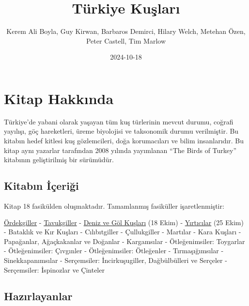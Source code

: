 \documentclass[
  a4paper,
  DIV=11,
  numbers=noendperiod]{scrreprt}
\title{Türkiye Kuşları}
\author{Kerem Ali Boyla, Guy Kirwan, Barbaros Demirci, Hilary Welch,
Metehan Özen, Peter Castell, Tim Marlow}
\date{2024-10-18}
\renewcommand*\contentsname{Table of contents}
\newcommand\contentsname{Table of contents}
\begin{document}
\maketitle

\renewcommand*\contentsname{Table of contents}
{
\hypersetup{linkcolor=}
\setcounter{tocdepth}{2}
\tableofcontents
}


\chapter*{Kitap Hakkında}\label{kitap-hakkux131nda}


Türkiye'de yabani olarak yaşayan tüm kuş türlerinin mevcut durumu,
coğrafi yayılışı, göç hareketleri, üreme biyolojisi ve taksonomik durumu
verilmiştir. Bu kitabın hedef kitlesi kuş gözlemcileri, doğa
korumacıları ve bilim insanlarıdır. Bu kitap aynı yazarlar tarafından
2008 yılında yayımlanan ``The Birds of Turkey'' kitabının geliştirilmiş
bir sürümüdür.

\section*{Kitabın İçeriği}\label{kitabux131n-iuxe7eriux11fi}


Kitap 18 fasikülden oluşmaktadır. Tamamlanmış fasiküller
işaretlenmiştir:

\href{https://keremaliboyla.github.io/turkiye-kuslari/01_ordekgiller.html}{Ördekgiller}
-
\href{https://keremaliboyla.github.io/turkiye-kuslari/02_tavukgiller.html}{Tavukgiller}
-
\href{https://keremaliboyla.github.io/turkiye-kuslari/03_deniz-ve-gol-kuslari.html}{Deniz
ve Göl Kuşları} (18 Ekim) -
\href{https://keremaliboyla.github.io/turkiye-kuslari/04_yirticilar.html}{Yırtıcılar}
(25 Ekim) - Bataklık ve Kır Kuşları - Cılıbıtgiller - Çullukgiller -
Martılar - Kara Kuşları - Papağanlar, Ağaçkakanlar ve Doğanlar -
Kargamsılar - Ötleğenimsiler: Toygarlar - Ötleğenimsiler: Çıvgınler -
Ötleğenimsiler: Ötleğenler - Tırmaşığımsılar - Sinekkapanımsılar -
Serçemsiler: İncirkuşugiller, Dağbülbülleri ve Serçeler - Serçemsiler:
İspinozlar ve Çinteler

\section*{Hazırlayanlar}\label{hazux131rlayanlar}
\end{document}
